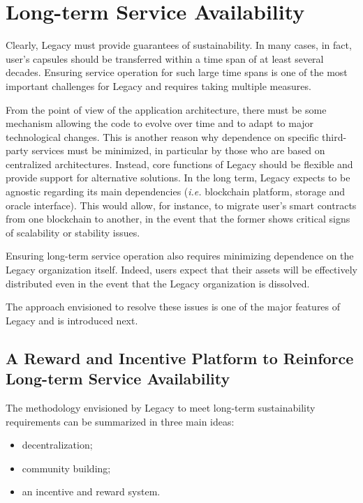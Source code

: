\section{Long-term Service Availability} %
\label{sub:long_term_service_availability}
Clearly, Legacy must provide guarantees of sustainability. In many cases, in fact, user's capsules should be transferred within a time span of at least several decades.  Ensuring service operation for such large time spans is one of the most important challenges for Legacy and requires taking multiple measures. 

From the point of view of the application architecture, there must be some mechanism allowing the code to evolve over time and to adapt to major technological changes. This is another reason why dependence on specific third-party services must be minimized, in particular by those who are based on centralized architectures. Instead, core functions of Legacy should be flexible and provide support for alternative solutions.
In the long term, Legacy expects to be agnostic regarding its main dependencies (\textit{i.e.} blockchain platform, storage and oracle interface). This would allow, for instance, to migrate user’s smart contracts from one blockchain to another, in the event that the former shows critical signs of scalability or stability issues. 

Ensuring long-term service operation also requires minimizing dependence on the Legacy organization itself. Indeed, users expect that their assets will be effectively distributed even in the event that the Legacy organization is dissolved. 

The approach envisioned to resolve these issues is one of the major features of Legacy and is introduced next.

\subsection*{A Reward and Incentive Platform to Reinforce Long-term Service Availability} %
\label{sub:a_reward_and_incentivisation_system}
The methodology envisioned by Legacy to meet long-term sustainability requirements can be summarized in three main ideas:
\begin{itemize}
	\item decentralization;
	\item community building;
	\item an incentive and reward system.
\end{itemize}

